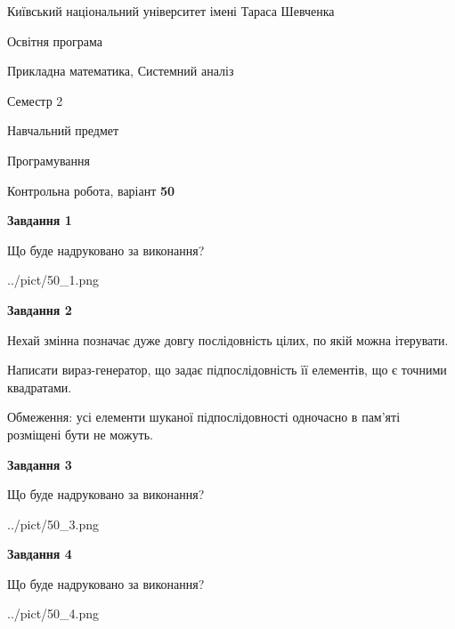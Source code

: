\documentclass[12pt, ukrainian]{article}
\begin{document}
{{\begin {small}\par
{ \center  Київський національний університет імені Тараса Шевченка \par}
{\parbox {5 cm}{Освітня програма \hfill}{\parbox {8 cm}{Прикладна математика, Системний аналіз \hfill}}\parbox {5 cm}{\hfill Семестр 2}}\par
{\parbox {5 cm} {Навчальний предмет \hfill}\parbox {7 cm}{Програмування \hfill}\parbox {6cm}{\hfill}\par}\vspace{-7pt} \end{small}}{\center Контрольна робота, варіант  \No \textbf
{ 50 }\par}}
{
\begin {large}
{\begin {center}\textbf{Завдання 1}\end {center}}\par
Що буде надруковано за виконання?\par\par
\begin{center}
	{../pict/50_1.png}
\end{center}
\newpage

{\begin {center}\textbf{Завдання 2}\end {center}}\par
Нехай змінна  позначає дуже довгу послідовність цілих, по якій можна ітерувати.

Написати вираз-генератор, що задає підпослідовність її елементів, що є точними квадратами.

Обмеження: усі елементи шуканої підпослідовності одночасно в пам'яті розміщені бути не можуть.\par
\newpage

{\begin {center}\textbf{Завдання 3}\end {center}}\par
Що буде надруковано за виконання?
\begin{center}
	{../pict/50_3.png}
\end{center}
\newpage

{\begin {center}\textbf{Завдання 4}\end {center}}\par
Що буде надруковано за виконання?\par
\begin{center}
	{../pict/50_4.png}
\end{center}
\newpage


\end{large}}
\end{document}
